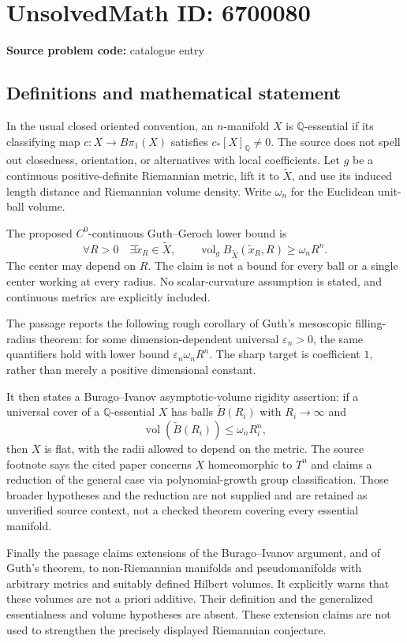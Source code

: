 \documentclass[11pt]{article}
\newcommand{\Q}{\mathbb{Q}}
\begin{document}
\section*{UnsolvedMath ID: 6700080}
\textbf{Source problem code:} catalogue entry
\subsection{Definitions and mathematical statement}
In the usual closed oriented convention, an $n$-manifold $X$ is $\Q$-essential if its classifying map $c:X\to B\pi_1(X)$ satisfies $c_*[X]_{\Q}\ne0$. The source does not spell out closedness, orientation, or alternatives with local coefficients. Let $g$ be a continuous positive-definite Riemannian metric, lift it to $\widetilde X$, and use its induced length distance and Riemannian volume density. Write $\omega_n$ for the Euclidean unit-ball volume.

The proposed $C^0$-continuous Guth--Geroch lower bound is
\[
 \forall R>0\quad\exists\widetilde x_R\in\widetilde X,
 \qquad
 \operatorname{vol}_g B_{\widetilde X}(\widetilde x_R,R)
          \ge\omega_n R^n.
\]
The center may depend on $R$. The claim is not a bound for every ball or a single center working at every radius. No scalar-curvature assumption is stated, and continuous metrics are explicitly included.

The passage reports the following rough corollary of Guth's mesoscopic filling-radius theorem: for some dimension-dependent universal $\varepsilon_n>0$, the same quantifiers hold with lower bound $\varepsilon_n\omega_nR^n$. The sharp target is coefficient $1$, rather than merely a positive dimensional constant.

It then states a Burago--Ivanov asymptotic-volume rigidity assertion: if a universal cover of a $\Q$-essential $X$ has balls $\widetilde B(R_i)$ with $R_i\to\infty$ and
\[
 \operatorname{vol}(\widetilde B(R_i))\le\omega_nR_i^n,
\]
then $X$ is flat, with the radii allowed to depend on the metric. The source footnote says the cited paper concerns $X$ homeomorphic to $T^n$ and claims a reduction of the general case via polynomial-growth group classification. Those broader hypotheses and the reduction are not supplied and are retained as unverified source context, not a checked theorem covering every essential manifold.

Finally the passage claims extensions of the Burago--Ivanov argument, and of Guth's theorem, to non-Riemannian manifolds and pseudomanifolds with arbitrary metrics and suitably defined Hilbert volumes. It explicitly warns that these volumes are not a priori additive. Their definition and the generalized essentialness and volume hypotheses are absent. These extension claims are not used to strengthen the precisely displayed Riemannian conjecture.
\end{document}
